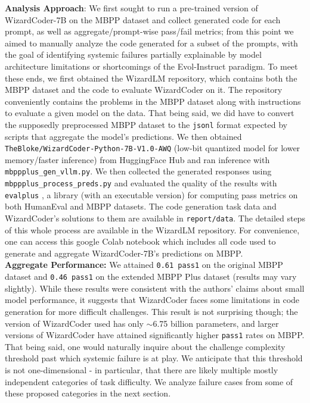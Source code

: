 \documentclass[10pt]{article}
\newcommand{\code}[1]{\texttt{#1}}
\theoremstyle{definition}
\begin{document}
\noindent\textbf{Analysis Approach}: We first sought to run a pre-trained version of WizardCoder-7B on the MBPP dataset and collect generated code for each prompt, as well as aggregate/prompt-wise pass/fail metrics; from this point we aimed to manually analyze the code generated for a subset of the prompts, with the goal of identifying systemic failures partially explainable by model architecture limitations or shortcomings of the Evol-Instruct paradigm. To meet these ends, we first obtained the WizardLM repository, which contains both the MBPP dataset and the code to evaluate WizardCoder on it. The repository conveniently contains the problems in the MBPP dataset along with instructions to evaluate a given model on the data. That being said, we did have to convert the supposedly preprocessed MBPP dataset to the \code{jsonl} format expected by scripts that aggregate the model's predictions. We then obtained \code{TheBloke/WizardCoder-Python-7B-V1.0-AWQ} (low-bit quantized model for lower memory/faster inference) from HuggingFace Hub and ran inference with \code{mbppplus\_gen\_vllm.py}. We then collected the generated responses using \code{mbppplus\_process\_preds.py} and evaluated the quality of the results with \code{evalplus} \cite{evalplus}, a library (with an executable version) for computing pass metrics on both HumanEval and MBPP datasets. The code generation task data and WizardCoder's solutions to them are available in \code{report/data}. The detailed steps of this whole process are available in the WizardLM repository. For convenience, one can access this google Colab notebook which includes all code used to generate and aggregate WizardCoder-7B's predictions on MBPP.\\

\noindent\textbf{Aggregate Performance:} We attained \code{0.61 pass1} on the original MBPP dataset and \code{0.46 pass1} on the extended MBPP Plus dataset (results may vary slightly). While these results were consistent with the authors' claims about small model performance, it suggests that WizardCoder faces some limitations in code generation for more difficult challenges. This result is not surprising though; the version of WizardCoder used has only $\sim$6.75 billion parameters, and larger versions of WizardCoder have attained significantly higher \code{pass1} rates on MBPP. That being said, one would naturally inquire about the challenge complexity threshold past which systemic failure is at play. We anticipate that this threshold is not one-dimensional - in particular, that there are likely multiple mostly independent categories of task difficulty. We analyze failure cases from some of these proposed categories in the next section.
\end{document}
